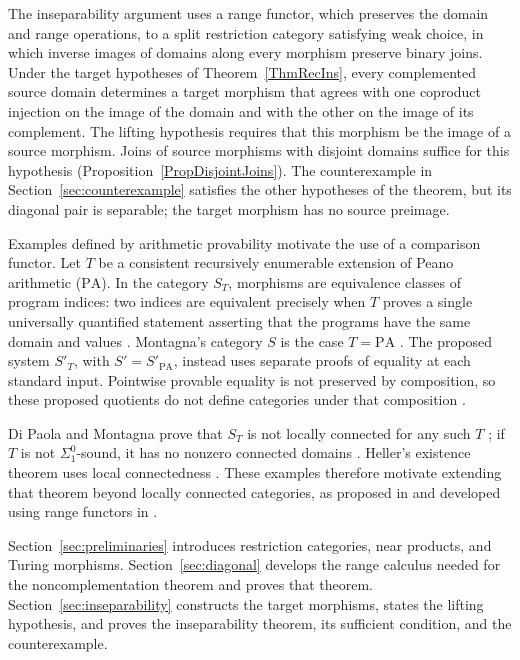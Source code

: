 \documentclass[letterpaper,10pt]{amsart}
\theoremstyle{plain}
\theoremstyle{definition}
\begin{document}
The inseparability argument uses a range functor, which preserves the
domain and range operations, to a split restriction category satisfying
weak choice, in which inverse images of domains along every morphism
preserve binary joins. Under the target hypotheses of
Theorem~\ref{ThmRecIns}, every complemented source domain determines a
target morphism that agrees with one coproduct injection on the image
of the domain and with the other on the image of its complement.
The lifting hypothesis requires that this morphism
be the image of a source morphism. Joins of source morphisms with
disjoint domains suffice for this hypothesis
(Proposition~\ref{PropDisjointJoins}). The counterexample in
Section~\ref{sec:counterexample} satisfies the other hypotheses of the
theorem, but its diagonal pair is separable; the target morphism has
no source preimage.

Examples defined by arithmetic provability motivate the use of a
comparison functor. Let $T$ be a consistent
recursively enumerable extension of Peano arithmetic ($\mathrm{PA}$).
In the category $S_T$, morphisms are equivalence classes of program
indices: two indices are equivalent precisely when $T$ proves a single
universally quantified statement asserting that the programs have the
same domain and values \cite[p.~646]{MR93b:03103}. Montagna's category
$S$ is the case $T=\mathrm{PA}$ \cite[p.~105]{MR90i:03046}.
The proposed system $S'_T$, with $S'=S'_{\mathrm{PA}}$, instead uses
separate proofs of equality at each standard input. Pointwise provable
equality is not preserved by composition, so these proposed quotients
do not define categories under that composition
\cite[Corollary~2]{leng2026composition}.

Di Paola and Montagna prove that $S_T$ is not locally connected for
any such $T$ \cite[Corollary~4.4]{MR93b:03103}; if $T$ is not
$\Sigma^0_1$-sound, it has no nonzero connected domains
\cite[Theorem~4.3(2)]{MR93b:03103}. Heller's existence theorem uses
local connectedness \cite{MR92e:03067}. These examples therefore
motivate extending that theorem beyond locally connected categories,
as proposed in \cite{MR93b:03103} and developed using range functors
in \cite{leng}.

Section~\ref{sec:preliminaries} introduces restriction categories,
near products, and Turing morphisms. Section~\ref{sec:diagonal}
develops the range calculus needed for the noncomplementation theorem
and proves that theorem. Section~\ref{sec:inseparability} constructs
the target morphisms, states the lifting hypothesis, and proves the
inseparability theorem, its sufficient condition, and the counterexample.
\end{document}
